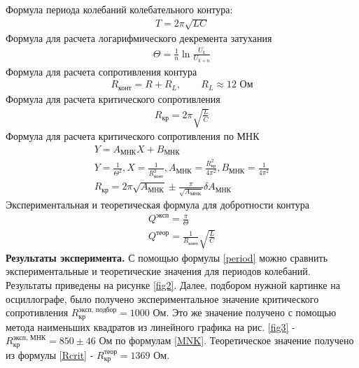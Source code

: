 \documentclass[a4paper,12pt]{article}
\begin{document}
Формула периода колебаний колебательного контура: 
\begin{equation} 
\begin{aligned} \label{period}
T = 2\pi\sqrt{LC}
\end{aligned}
\end{equation}
Формула для расчета логарифмического декремента затухания
\begin{equation} 
\begin{aligned} \label{logdek}
\Theta = \frac{1}{n}\ln\frac{U_k}{U_{k+n}}
\end{aligned}
\end{equation}
Формула для расчета сопротивления контура
\begin{equation} 
\begin{aligned} \label{Rsum}
R_{\text{конт}} = R + R_L,\text{ {  }   } R_L \approx 12 \text{ Ом}
\end{aligned}
\end{equation}
Формула для расчета критического сопротивления
\begin{equation} 
\begin{aligned} \label{Rcrit}
R_{\text{кр}} = 2\pi\sqrt{\frac{L}{C}}
\end{aligned}
\end{equation}
Формула для расчета критического сопротивления по МНК
\begin{equation} 
\begin{aligned} \label{MNK}
Y = A_{\text{МНК}}X+B_{\text{МНК}} \\
Y = \frac{1}{\Theta^2}, X = \frac{1}{R_{\text{конт}}^2}, A_{\text{МНК}} = \frac{R_{\text{кр}}^2}{4\pi^2}, B_{\text{МНК}} =  \frac{1}{4\pi^2} \\
R_{\text{кр}} = 2\pi\sqrt{A_{\text{МНК}}} \pm \frac{\pi}{\sqrt{A_{\text{МНК}}}}\delta A_{\text{МНК}}
\end{aligned}
\end{equation}
Экспериментальная и теоретическая формула для добротности контура
\begin{equation} 
\begin{aligned} \label{Dobr}
Q^\text{эксп}= \frac{\pi}{\Theta} \\
Q^\text{теор}= \frac{1}{R_\text{конт}}\sqrt{\frac{L}{C}}
\end{aligned}
\end{equation}
{\bfseries Результаты эксперимента.} С помощью формулы \ref{period} можно сравнить экспериментальные и теоретические значения для периодов колебаний. Результаты приведены на рисунке \ref{fig2}. Далее, подбором нужной картинке на осциллографе, было получено экспериментальное значение критического сопротивления $R_\text{кр}^\text{эксп, подбор} = 1000 \text{ Ом}$. Это же значение получено с помощью метода наименьших квадратов из линейного графика на рис. \ref{fig3} - $R_\text{кр}^\text{эксп, МНК} = 850 \pm 46 \text{ Ом}$  по формулам \ref{MNK}. Теоретическое значение получено из формулы \ref{Rcrit} - $R_\text{кр}^\text{теор} = 1369 \text{ Ом}$.
\end{document}
